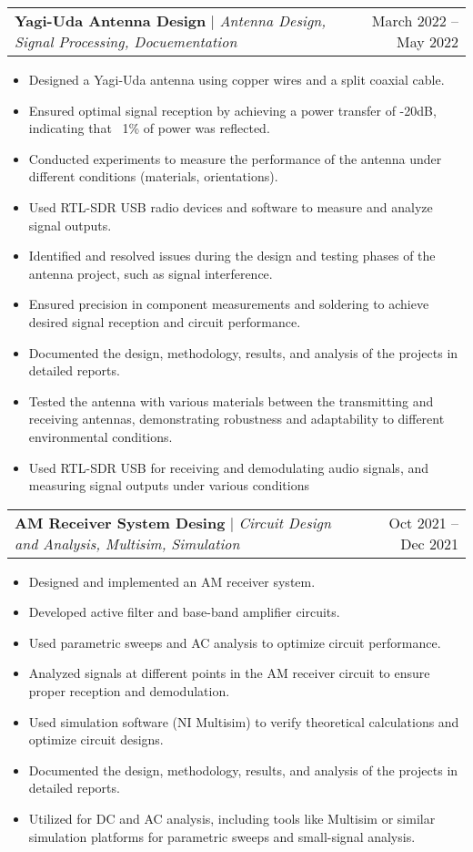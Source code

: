 \documentclass[A4,10pt]{article}
\makeatletter
\newcommand{\resumeItem}[1]{
  \item\small{
    {#1 \vspace{-2pt}}
  }
}
\newcommand{\resumeProjectHeading}[2]{
    \item
    \begin{tabular*}{0.97\textwidth}{l@{\extracolsep{\fill}}r}
      \small#1 & #2 \\
    \end{tabular*}\vspace{-7pt}
}
\newcommand{\resumeItemListStart}{\begin{itemize}}
\newcommand{\resumeItemListEnd}{\end{itemize}\vspace{-5pt}}
\makeatother
\begin{document}
        \resumeProjectHeading
        {\textbf{Yagi-Uda Antenna Design} $|$ \emph{Antenna Design, Signal Processing, Docuementation}}{March 2022 -- May 2022}
        \resumeItemListStart
          \resumeItem{Designed a Yagi-Uda antenna using copper wires and a split coaxial cable.}
          \resumeItem{Ensured optimal signal reception by achieving a power transfer of -20dB, indicating that ~1\% of power was reflected.}
          \resumeItem{Conducted experiments to measure the performance of the antenna under different conditions (materials, orientations).}
          \resumeItem{Used RTL-SDR USB radio devices and software to measure and analyze signal outputs.}
          \resumeItem{Identified and resolved issues during the design and testing phases of the antenna project, such as signal interference.}
          \resumeItem{Ensured precision in component measurements and soldering to achieve desired signal reception and circuit performance.}
          \resumeItem{Documented the design, methodology, results, and analysis of the projects in detailed reports.}
          \resumeItem{Tested the antenna with various materials between the transmitting and receiving antennas, demonstrating robustness and adaptability to different environmental conditions.}
          \resumeItem{Used RTL-SDR USB for receiving and demodulating audio signals, and measuring signal outputs under various conditions}
        \resumeItemListEnd
        
        \resumeProjectHeading
        {\textbf{AM Receiver System Desing} $|$ \emph{Circuit Design and Analysis, Multisim, Simulation}}{Oct 2021 -- Dec 2021}
        \resumeItemListStart
          \resumeItem{Designed and implemented an AM receiver system.}
          \resumeItem{Developed active filter and base-band amplifier circuits.}
          \resumeItem{Used parametric sweeps and AC analysis to optimize circuit performance.}
          \resumeItem{Analyzed signals at different points in the AM receiver circuit to ensure proper reception and demodulation.}
          \resumeItem{Used simulation software (NI Multisim) to verify theoretical calculations and optimize circuit designs.}
          \resumeItem{Documented the design, methodology, results, and analysis of the projects in detailed reports.}
          \resumeItem{Utilized for DC and AC analysis, including tools like Multisim or similar simulation platforms for parametric sweeps and small-signal analysis.}
        \resumeItemListEnd
  
\end{document}
